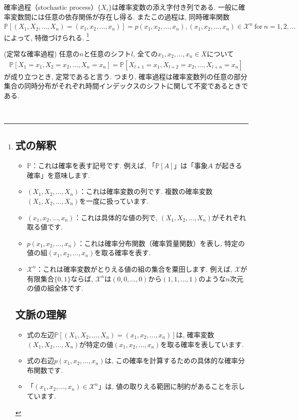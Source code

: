 \documentclass[a4j]{jsarticle}
\begin{document}
確率過程（stochastic process）$\{X_i\}$は確率変数の添え字付き列である. 一般に確率変数間には任意の依存関係が存在し得る. またこの過程は, 同時確率関数$\mathbb{P}[(X_1, X_2, \ldots, X_n) = (x_1, x_2, \ldots, x_n)] = p(x_1, x_2, \ldots, x_n), (x_1, x_2, \ldots, x_n) \in \mathcal{X}^n \: \mbox{for} \: n = 1, 2, \ldots$によって, 特徴づけられる.
\footnote{
	\subsection*{式の解釈}
	\begin{itemize}
		\item $\mathbb{P}$：これは確率を表す記号です. 例えば, 「$\mathbb{P}[A]$」は「事象$A$ が起きる確率」を意味します.
		\item $(X_1, X_2, \ldots, X_n)$：これは確率変数の列です. 複数の確率変数$(X_1, X_2, \ldots, X_n)$を一度に扱っています.
		\item $(x_1, x_2, \ldots, x_n)$：これは具体的な値の列で, $(X_1, X_2, \ldots, X_n)$がそれぞれ取る値です.
		\item $p(x_1, x_2, \ldots, x_n)$：これは確率分布関数（確率質量関数）を表し, 特定の値の組$(x_1, x_2, \ldots, x_n)$を取る確率を表す.
		\item $\mathcal{X}^n$：これは確率変数がとりえる値の組の集合を粟田します. 例えば, $\mathcal{X}$が有限集合$\{0, 1\}$ならば, $\mathcal{X}^n$は$(0,0,\ldots, 0)$から$(1,1,\ldots, 1)$のような$n$次元の値の組全体です.
	\end{itemize}
	\subsection*{文脈の理解}
	\begin{itemize}
		\item 式の左辺$\mathbb{P}[(X_1, X_2, \ldots, X_n) = (x_1, x_2, \ldots, x_n)]$は, 確率変数$(X_1, X_2, \ldots, X_n)$が特定の値$(x_1, x_2, \ldots, x_n)$を取る確率を表しています.
		\item 式の右辺$p(x_1, x_2, \ldots, x_n)$は, この確率を計算するための具体的な確率分布関数です.
		\item 「$(x_1, x_2, \ldots, x_n) \in \mathcal{X}^n$」は, 値の取りえる範囲に制約があることを示しています.
	\end{itemize}
}
\\

\begin{itembox}[l]{ (定常な確率過程)}
	任意の$n$と任意のシフト$l$, 全ての$x_1, x_2, \ldots, x_n \in X$について
	\begin{align}
		\mathbb{P}[X_1 = x_1, X_2 =x_2, \ldots, X_n = x_n] = \mathbb{P}[X_{l + 1} = x_1, X_{l + 2} =x_2, \ldots, X_{l + n} = x_n]
	\end{align}
	が成り立つとき, 定常であると言う.
	つまり, 確率過程は確率変数列の任意の部分集合の同時分布がそれぞれ時間インデックスのシフトに関して不変であるときである.
\end{itembox}\\
\end{document}
